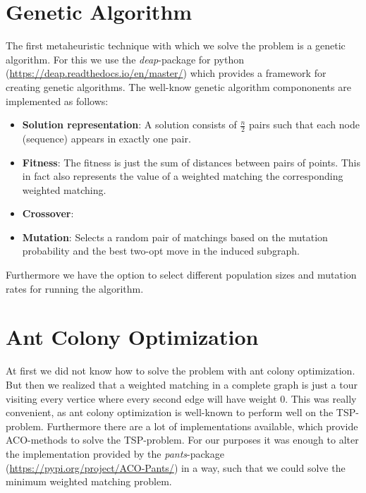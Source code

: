 \documentclass[12pt]{article}
\begin{document}
\section{Genetic Algorithm}
The first metaheuristic technique with which we solve the problem is a genetic algorithm.
For this we use the \textit{deap}-package for python (\url{https://deap.readthedocs.io/en/master/}) which provides a framework for creating genetic algorithms.
The well-know genetic algorithm compononents are implemented as follows:
\begin{itemize}
    \item \textbf{Solution representation}: A solution consists of $\frac{n}{2}$ pairs such that each node (sequence) appears in exactly one pair.
    \item \textbf{Fitness}: The fitness is just the sum of distances between pairs of points. 
    This in fact also represents the value of a weighted matching the corresponding weighted matching.
    \item \textbf{Crossover}: 
    \item \textbf{Mutation}: Selects a random pair of matchings based on the mutation probability and the best two-opt move in the induced subgraph. 
\end{itemize}
Furthermore we have the option to select different population sizes and mutation rates for running the algorithm.

\section{Ant Colony Optimization}
At first we did not know how to solve the problem with ant colony optimization.
But then we realized that a weighted matching in a complete graph is just a tour visiting every vertice where every second edge will have weight 0.
This was really convenient, as ant colony optimization is well-known to perform well on the TSP-problem.
Furthermore there are a lot of implementations available, which provide ACO-methods to solve the TSP-problem.
For our purposes it was enough to alter the implementation provided by the \textit{pants}-package (\url{https://pypi.org/project/ACO-Pants/}) in a way, such that we could solve the minimum weighted matching problem.
\end{document}
